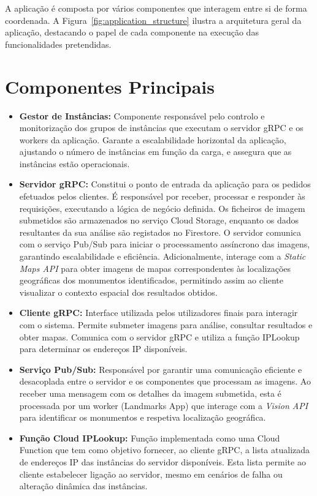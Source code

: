 A aplicação é composta por vários componentes que interagem entre si de forma
coordenada. A Figura~\ref{fig:application_structure} ilustra a arquitetura
geral da aplicação, destacando o papel de cada componente na execução das
funcionalidades pretendidas.

\section{Componentes Principais}

\begin{itemize}

	\item \textbf{Gestor de Instâncias:} Componente responsável pelo controlo e monitorização dos grupos de instâncias que executam o servidor gRPC e os workers da aplicação. Garante a escalabilidade horizontal da aplicação, ajustando o número de instâncias em função da carga, e assegura que as instâncias estão operacionais.

	\item \textbf{Servidor gRPC:} Constitui o ponto de entrada da aplicação para os pedidos efetuados pelos clientes. É responsável por receber, processar e responder às requisições, executando a lógica de negócio definida. Os ficheiros de imagem submetidos são armazenados no serviço Cloud Storage, enquanto os dados resultantes da sua análise são registados no Firestore. O servidor comunica com o serviço Pub/Sub para iniciar o processamento assíncrono das imagens, garantindo escalabilidade e eficiência. Adicionalmente, interage com a \textit{Static Maps API} para obter imagens de mapas correspondentes às localizações geográficas dos monumentos identificados, permitindo assim ao cliente visualizar o contexto espacial dos resultados obtidos.

	\item \textbf{Cliente gRPC:} Interface utilizada pelos utilizadores finais para interagir com o sistema. Permite submeter imagens para análise, consultar resultados e obter mapas. Comunica com o servidor gRPC e utiliza a função IPLookup para determinar os endereços IP disponíveis.

	\item \textbf{Serviço Pub/Sub:} Responsável por garantir uma comunicação eficiente e desacoplada entre o servidor e os componentes que processam as imagens. Ao receber uma mensagem com os detalhes da imagem submetida, esta é processada por um worker (Landmarks App) que interage com a \textit{Vision API} para identificar os monumentos e respetiva localização geográfica.

	\item \textbf{Função Cloud IPLookup:} Função implementada como uma Cloud Function que tem como objetivo fornecer, ao cliente gRPC, a lista atualizada de endereços IP das instâncias do servidor disponíveis. Esta lista permite ao cliente estabelecer ligação ao servidor, mesmo em cenários de falha ou alteração dinâmica das instâncias.

\end{itemize}

